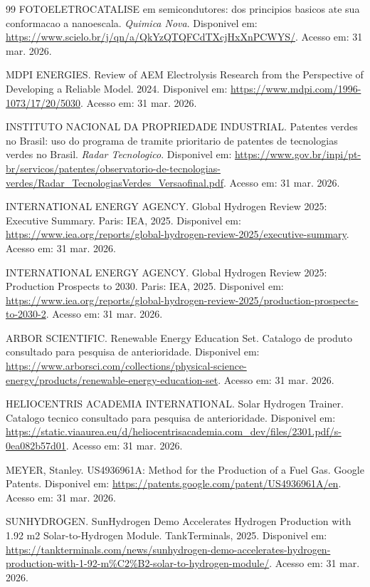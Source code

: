 \documentclass[12pt,oneside,a4paper,english,brazilian]{abntex2}
\begin{document}
\begin{thebibliography}{99}
FOTOELETROCATALISE em semicondutores: dos principios basicos ate sua conformacao a nanoescala. \textit{Quimica Nova}. Disponivel em: \url{https://www.scielo.br/j/qn/a/QkYzQTQFCdTXcjHxXnPCWYS/}. Acesso em: 31 mar. 2026.

MDPI ENERGIES. Review of AEM Electrolysis Research from the Perspective of Developing a Reliable Model. 2024. Disponivel em: \url{https://www.mdpi.com/1996-1073/17/20/5030}. Acesso em: 31 mar. 2026.

INSTITUTO NACIONAL DA PROPRIEDADE INDUSTRIAL. Patentes verdes no Brasil: uso do programa de tramite prioritario de patentes de tecnologias verdes no Brasil. \textit{Radar Tecnologico}. Disponivel em: \url{https://www.gov.br/inpi/pt-br/servicos/patentes/observatorio-de-tecnologias-verdes/Radar_TecnologiasVerdes_Versaofinal.pdf}. Acesso em: 31 mar. 2026.

INTERNATIONAL ENERGY AGENCY. Global Hydrogen Review 2025: Executive Summary. Paris: IEA, 2025. Disponivel em: \url{https://www.iea.org/reports/global-hydrogen-review-2025/executive-summary}. Acesso em: 31 mar. 2026.

INTERNATIONAL ENERGY AGENCY. Global Hydrogen Review 2025: Production Prospects to 2030. Paris: IEA, 2025. Disponivel em: \url{https://www.iea.org/reports/global-hydrogen-review-2025/production-prospects-to-2030-2}. Acesso em: 31 mar. 2026.

ARBOR SCIENTIFIC. Renewable Energy Education Set. Catalogo de produto consultado para pesquisa de anterioridade. Disponivel em: \url{https://www.arborsci.com/collections/physical-science-energy/products/renewable-energy-education-set}. Acesso em: 31 mar. 2026.

HELIOCENTRIS ACADEMIA INTERNATIONAL. Solar Hydrogen Trainer. Catalogo tecnico consultado para pesquisa de anterioridade. Disponivel em: \url{https://static.viaaurea.eu/d/heliocentrisacademia.com_dev/files/2301.pdf/s-0ea082b57d01}. Acesso em: 31 mar. 2026.

MEYER, Stanley. US4936961A: Method for the Production of a Fuel Gas. Google Patents. Disponivel em: \url{https://patents.google.com/patent/US4936961A/en}. Acesso em: 31 mar. 2026.

SUNHYDROGEN. SunHydrogen Demo Accelerates Hydrogen Production with 1.92 m2 Solar-to-Hydrogen Module. TankTerminals, 2025. Disponivel em: \url{https://tankterminals.com/news/sunhydrogen-demo-accelerates-hydrogen-production-with-1-92-m%C2%B2-solar-to-hydrogen-module/}. Acesso em: 31 mar. 2026.


\end{thebibliography}
\end{document}
